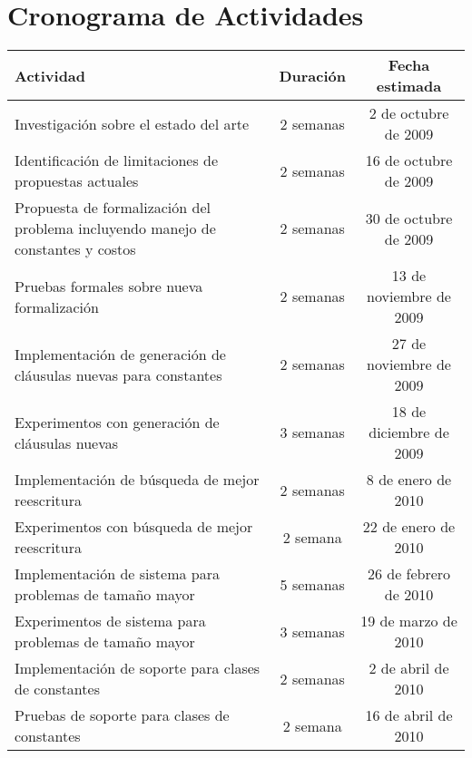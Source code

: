 \section{Cronograma de Actividades}

\begin{tabular}{|p{8cm}|c|c|}
\hline
Actividad & Duración & Fecha estimada \\
\hline
\hline
Investigación sobre el estado del arte & 2 semanas & 2 de octubre de 2009\\
\hline
Identificación de limitaciones de propuestas actuales & 2 semanas & 16 de octubre de 2009\\
\hline
Propuesta de formalización del problema incluyendo manejo de constantes y costos & 2 semanas & 30 de octubre de 2009 \\
\hline
Pruebas formales sobre nueva formalización & 2 semanas &  13 de noviembre de 2009 \\
\hline
Implementación de generación de cláusulas nuevas para constantes & 2 semanas & 27 de noviembre de 2009 \\
\hline
Experimentos con generación de cláusulas nuevas & 3 semanas & 18 de diciembre de 2009 \\
\hline
Implementación de búsqueda de mejor reescritura & 2 semanas & 8 de enero de 2010 \\
\hline
Experimentos con búsqueda de mejor reescritura & 2 semana & 22 de enero de 2010 \\
\hline
Implementación de sistema para problemas de tamaño mayor & 5 semanas & 26 de febrero de 2010 \\
\hline
Experimentos de sistema para problemas de tamaño mayor & 3 semanas & 19 de marzo de 2010 \\
\hline
Implementación de soporte para clases de constantes & 2 semanas & 2 de abril de 2010 \\
\hline
Pruebas de soporte para clases de constantes & 2 semana & 16 de abril de 2010 \\
\hline
\end{tabular}
